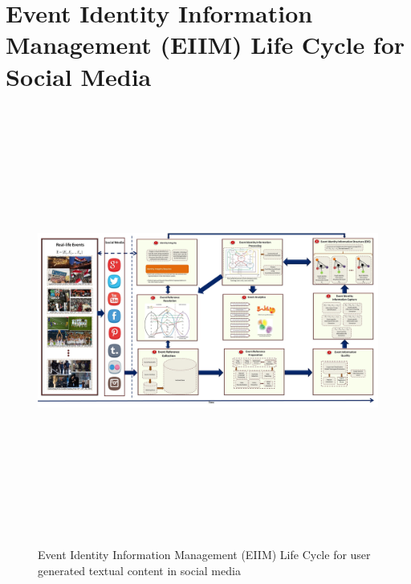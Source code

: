 
\chapter{Event Identity Information Management (EIIM) Life Cycle for Social Media} %

\label{eiim} %

\doublespacing
\setlength{\parindent}{1cm}


\begin{figure}
\caption{Event Identity Information Management (EIIM) Life Cycle for user generated textual content in social media}
\includegraphics[width=24cm,height=14cm]{Figures/NewEIIM.jpg}
\label{eiimFig2}
\end{figure}


